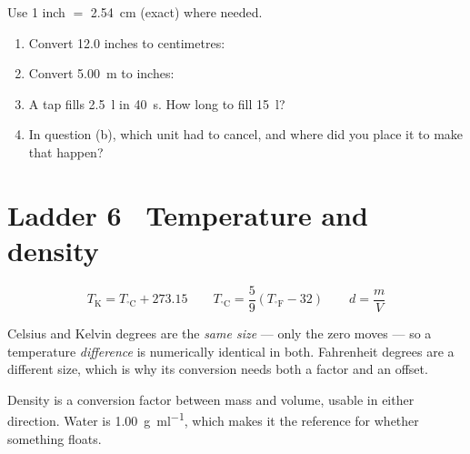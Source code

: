 \documentclass{apchem-worksheet}
\begin{document}
\begin{yourturn}
Use 1 inch $=$ \SI{2.54}{\centi\meter} (exact) where needed.
\begin{enumerate}[leftmargin=*,itemsep=0.5em]
  \item Convert 12.0 inches to centimetres: \workspace[1.2cm]
  \item Convert \SI{5.00}{\meter} to inches: \workspace[1.4cm]
  \item A tap fills \SI{2.5}{\litre} in \SI{40}{\second}. How long to
        fill \SI{15}{\litre}? \workspace[1.6cm]
  \item In question (b), which unit had to cancel, and where did you
        place it to make that happen? \workspace[1.4cm]
\end{enumerate}
\end{yourturn}

\section*{\sffamily Ladder 6 \textbullet\ Temperature and density}

\[ T_{\text{K}} = T_{^\circ\text{C}} + 273.15 \qquad
   T_{^\circ\text{C}} = \frac{5}{9}\left(T_{^\circ\text{F}} - 32\right)
   \qquad d = \frac{m}{V} \]

Celsius and Kelvin degrees are the \emph{same size} --- only the zero
moves --- so a temperature \emph{difference} is numerically identical in
both. Fahrenheit degrees are a different size, which is why its
conversion needs both a factor and an offset.

Density is a conversion factor between mass and volume, usable in either
direction. Water is \SI{1.00}{\gram\per\milli\litre}, which makes it the
reference for whether something floats.
\end{document}
